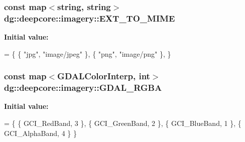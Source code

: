 \subsubsection[{\texorpdfstring{E\+X\+T\+\_\+\+T\+O\+\_\+\+M\+I\+ME}{EXT_TO_MIME}}]{\setlength{\rightskip}{0pt plus 5cm}const map$<$string, string$>$ dg\+::deepcore\+::imagery\+::\+E\+X\+T\+\_\+\+T\+O\+\_\+\+M\+I\+ME\hspace{0.3cm}{\ttfamily [static]}}\hypertarget{namespacedg_1_1deepcore_1_1imagery_ac6e711bbab3158f9c5e5d9e283dea88d}{}\label{namespacedg_1_1deepcore_1_1imagery_ac6e711bbab3158f9c5e5d9e283dea88d}
{\bfseries Initial value\+:}
\begin{DoxyCode}
= \{
    \{ \textcolor{stringliteral}{"jpg"}, \textcolor{stringliteral}{"image/jpeg"} \},
    \{ \textcolor{stringliteral}{"png"}, \textcolor{stringliteral}{"image/png"} \},
\}
\end{DoxyCode}
\subsubsection[{\texorpdfstring{G\+D\+A\+L\+\_\+\+R\+G\+BA}{GDAL_RGBA}}]{\setlength{\rightskip}{0pt plus 5cm}const map$<$G\+D\+A\+L\+Color\+Interp, int$>$ dg\+::deepcore\+::imagery\+::\+G\+D\+A\+L\+\_\+\+R\+G\+BA\hspace{0.3cm}{\ttfamily [static]}}\hypertarget{namespacedg_1_1deepcore_1_1imagery_a3e6b06d7bc0e97ec15a9c43b65740ad6}{}\label{namespacedg_1_1deepcore_1_1imagery_a3e6b06d7bc0e97ec15a9c43b65740ad6}
{\bfseries Initial value\+:}
\begin{DoxyCode}
= \{
    \{ GCI\_RedBand, 3 \},
    \{ GCI\_GreenBand, 2 \},
    \{ GCI\_BlueBand, 1 \},
    \{ GCI\_AlphaBand, 4 \}
\}
\end{DoxyCode}
